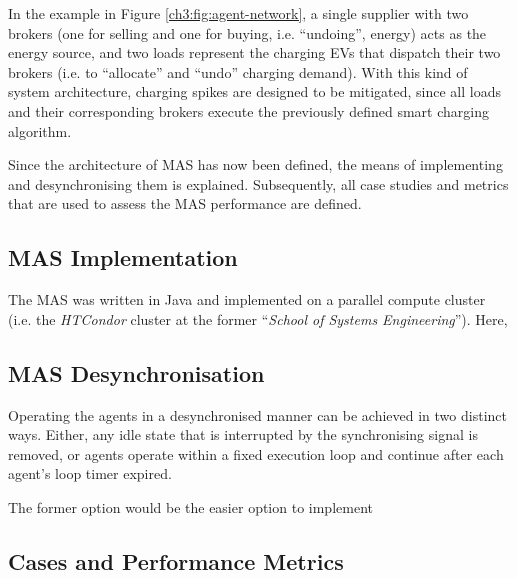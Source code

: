In the example in Figure \ref{ch3:fig:agent-network}, a single supplier with two brokers (one for selling and one for buying, i.e. ``undoing'', energy) acts as the energy source, and two loads represent the charging EVs that dispatch their two brokers (i.e. to ``allocate'' and ``undo'' charging demand).
With this kind of system architecture, charging spikes are designed to be mitigated, since all loads and their corresponding brokers execute the previously defined smart charging algorithm.

Since the architecture of MAS has now been defined, the means of implementing and desynchronising them is explained.
Subsequently, all case studies and metrics that are used to assess the MAS performance are defined.

\subsection{MAS Implementation}
\label{ch3:subsec:implementation}

The MAS was written in Java and implemented on a parallel compute cluster (i.e. the \textit{HTCondor} cluster at the former ``\textit{School of Systems Engineering}'').
Here, 



\subsection{MAS Desynchronisation}
\label{ch3:subsec:desynchronisation}

Operating the agents in a desynchronised manner can be achieved in two distinct ways.
Either, any idle state that is interrupted by the synchronising signal is removed, or agents operate within a fixed execution loop and continue after each agent's loop timer expired.

The former option would be the easier option to implement

\subsection{Cases and Performance Metrics}
\label{ch3:subsec:cases-and-metrics}









